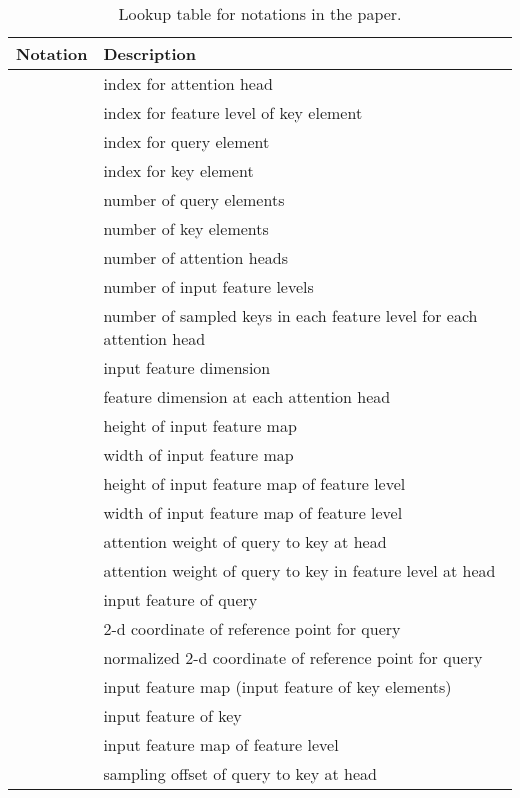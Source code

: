 \documentclass{article}
\begin{document}
\begin{table}[ht]
\caption{Lookup table for notations in the paper.}
\label{notations_lookup}
\begin{center}
\begin{tabular}{ll}
\Xhline{2\arrayrulewidth}
Notation           & Description \\
\hline
                & index for attention head \\
                & index for feature level of key element \\
                & index for query element \\
                & index for key element \\
              & number of query elements \\
              & number of key elements \\
                & number of attention heads \\
                & number of input feature levels \\
                & number of sampled keys in each feature level for each attention head \\
                & input feature dimension \\
              & feature dimension at each attention head \\
                & height of input feature map \\
                & width of input feature map \\
              & height of input feature map of  feature level \\
              & width of input feature map of  feature level \\
       & attention weight of  query to  key at  head \\
      & attention weight of  query to  key in  feature level at  head \\
            & input feature of  query \\
            & 2-d coordinate of reference point for  query \\
       & normalized 2-d coordinate of reference point for  query \\
              & input feature map (input feature of key elements) \\
            & input feature of  key \\
            & input feature map of  feature level \\
  & sampling offset of  query to  key at  head \\

\end{tabular}
\end{center}
\end{table}
\end{document}
